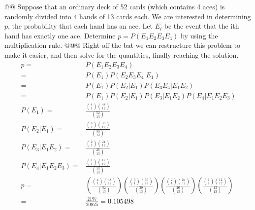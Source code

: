 \documentclass[10pt]{article}
\begin{document}
\begin{easylist}[enumerate]
    @@ Suppose that an ordinary deck of 52 cards (which contains 4 aces) is randomly divided into 4 hands of 13 cards
    each. We are interested in determining $p$, the probability that each hand has an ace. Let $E_i$ be the event that
    the ith hand has exactly one ace.  Determine $p = P(E_1 E_2 E_3 E_4 )$ by using the multiplication rule.
    @@@ Right off the bat we can restructure this problem to make it easier, and then solve for the quantities, finally
    reaching the solution.
        \[
            \begin{aligned}
                p =& P(E_1 E_2 E_3 E_4)\\
                  =& P(E_1) P(E_2 E_3 E_4|E_1)\\
                  =& P(E_1) P(E_2|E_1) P(E_3 E_4 | E_1 E_2)\\
                  =& P(E_1) P(E_2|E_1) P(E_3|E_1 E_2) P(E_4|E_1E_2E_3)\\
              P(E_1) =& \frac{\binom{4}{1} \binom{48}{12} }{\binom{52}{13} }\\
              P(E_2|E_1) =& \frac{\binom{3}{1} \binom{36}{12} }{\binom{39}{13} }\\
              P(E_3|E_1E_2) =& \frac{\binom{2}{1} \binom{24}{12} }{\binom{26}{13} }\\
              P(E_4|E_1E_2E_3) =& \frac{\binom{1}{1} \binom{12}{12} }{\binom{13}{13} }\\
              p =&
              \left( \frac{\binom{4}{1} \binom{48}{12} }{\binom{52}{13} } \right)
              \left( \frac{\binom{3}{1} \binom{36}{12} }{\binom{39}{13} } \right)
              \left( \frac{\binom{2}{1} \binom{24}{12} }{\binom{26}{13} } \right)
              \left( \frac{\binom{1}{1} \binom{12}{12} }{\binom{13}{13} } \right)\\
              =& \frac{2197}{20825} = \boxed{0.105498}
            \end{aligned}
        \]


\end{easylist}
\end{document}
